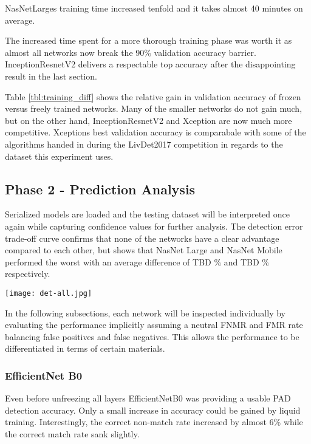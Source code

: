 


NasNetLarges training time increased tenfold and it takes almost 40 minutes on average.





The increased time spent for a more thorough training phase was worth it as almost all networks now break the 90\% validation accuracy barrier.
InceptionResnetV2 delivers a respectable top accuracy after the disappointing result in the last section.





Table \ref{tbl:training_diff} shows the relative gain in validation accuracy of frozen versus freely trained networks.
Many of the smaller networks do not gain much, but on the other hand, InceptionResnetV2 and Xception are now much more competitive.
Xceptions best validation accuracy is comparabale with some of the algorithms handed in during the LivDet2017 competition in regards to the dataset this experiment uses. \cite{LIVDET}

\hfill

\subsection{Phase 2 - Prediction Analysis}
Serialized models are loaded and the testing dataset will be interpreted once again while capturing confidence values for further analysis.
The detection error trade-off curve confirms that none of the networks have a clear advantage compared to each other, but shows that NasNet Large and NasNet Mobile performed the worst with an average difference of TBD \% and TBD \% respectively.



\texttt{[image: det-all.jpg]}


In the following subsections, each network will be inspected individually by evaluating the performance implicitly assuming a neutral FNMR and FMR rate balancing false positives and false negatives.
This allows the performance to be differentiated in terms of certain materials.


\newpage
\subsubsection{EfficientNet B0}
Even before unfreezing all layers EfficientNetB0 was providing a usable PAD detection accuracy.
Only a small increase in accuracy could be gained by liquid training.
Interestingly, the correct non-match rate increased by almost 6\% while the correct match rate sank slightly.

